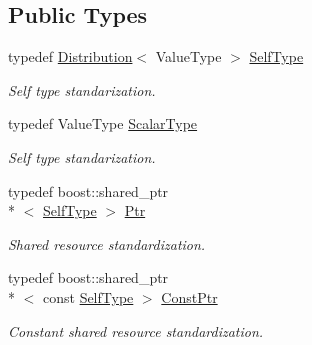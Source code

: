\subsection*{Public Types}
\begin{DoxyCompactItemize}
\item 
typedef \hyperlink{classffnn_1_1distribution_1_1_distribution}{Distribution}$<$ Value\-Type $>$ \hyperlink{classffnn_1_1distribution_1_1_distribution_ae1a3da8f16a034d6c051fcfdcf69f0d2}{Self\-Type}
\begin{DoxyCompactList}\small\item\em Self type standarization. \end{DoxyCompactList}\item 
typedef Value\-Type \hyperlink{classffnn_1_1distribution_1_1_distribution_ad62797f0dcb4bb4698bdf17e3f3b07bb}{Scalar\-Type}
\begin{DoxyCompactList}\small\item\em Self type standarization. \end{DoxyCompactList}\item 
typedef boost\-::shared\-\_\-ptr\\*
$<$ \hyperlink{classffnn_1_1distribution_1_1_distribution_ae1a3da8f16a034d6c051fcfdcf69f0d2}{Self\-Type} $>$ \hyperlink{classffnn_1_1distribution_1_1_distribution_a51d4ea875b70b07862c5f68b20c8f41a}{Ptr}
\begin{DoxyCompactList}\small\item\em Shared resource standardization. \end{DoxyCompactList}\item 
typedef boost\-::shared\-\_\-ptr\\*
$<$ const \hyperlink{classffnn_1_1distribution_1_1_distribution_ae1a3da8f16a034d6c051fcfdcf69f0d2}{Self\-Type} $>$ \hyperlink{classffnn_1_1distribution_1_1_distribution_a829c8056b31313f6196f5659ca9503cc}{Const\-Ptr}
\begin{DoxyCompactList}\small\item\em Constant shared resource standardization. \end{DoxyCompactList}\end{DoxyCompactItemize}
